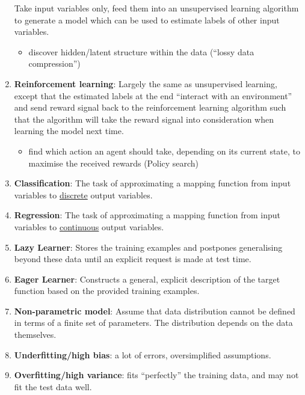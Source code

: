 \documentclass[twocolumn,landscape,10pt]{article}
\theoremstyle{definition}
\begin{document}
\begin{enumerate}
        Take input variables only, feed them into an unsupervised learning
        algorithm to generate a model which can be used to estimate labels of
        other input variables.
        \begin{itemize}
            \item discover hidden/latent structure within the data (``lossy data
                compression'')
        \end{itemize} 
    \item \textbf{Reinforcement learning}:
        Largely the same as unsupervised learning, except that
        the estimated labels at the end ``interact with an
        environment'' and send reward signal back to the reinforcement learning
        algorithm such that the algorithm will take the reward signal into
        consideration when learning the model next time.
        \begin{itemize}
            \item find which action an agent should take, depending on 
                its current state, to maximise the received rewards (Policy
                search)
        \end{itemize} 
    \item \textbf{Classification}:
        The task of approximating a mapping function from input variables to
        \underline{discrete} output variables.
    \item \textbf{Regression}:
        The task of approximating a mapping function from input variables to
        \underline{continuous} output variables.
    \item \textbf{Lazy Learner}:
        Stores the training examples and postpones generalising beyond these
        data until an explicit request is made at test time.
    \item \textbf{Eager Learner}:
        Constructs a general, explicit description of the target function based
        on the provided training examples.
    \item \textbf{Non-parametric model}: Assume that data distribution cannot be
        defined in terms of a finite set of parameters.
        The distribution depends on the data themselves.
    \item \textbf{Underfitting/high bias}: a lot of errors, oversimplified
        assumptions.
    \item \textbf{Overfitting/high variance}: fits ``perfectly'' the training
        data, and may not fit the test data well.
\end{enumerate} 
\end{document}
